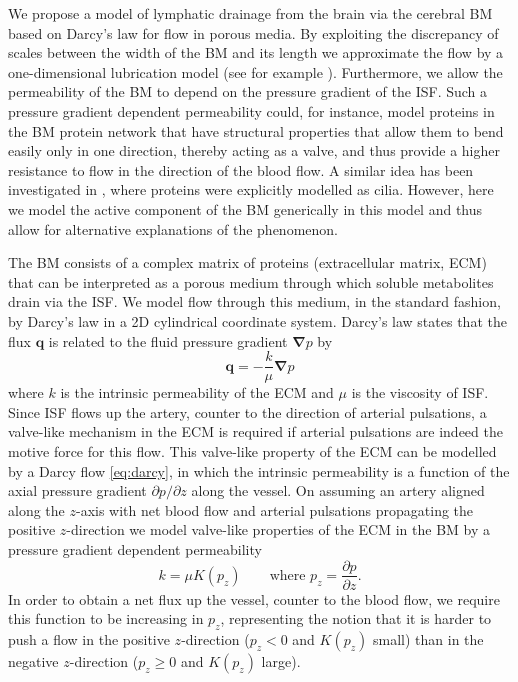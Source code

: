 \documentclass{frontiersFPHY} %
\newcommand{\q}{\boldsymbol{q}}
\newcommand{\dd}{\partial}
\begin{document}
We propose a model of lymphatic drainage from the brain via the cerebral BM based on Darcy's law for flow in porous media. By exploiting the discrepancy of scales between the width of the BM and its length we approximate the flow by a one-dimensional lubrication model (see for example \cite{Ockendon1995}). Furthermore, we allow the permeability of the BM to depend on the pressure gradient of the ISF. Such a pressure gradient dependent permeability could, for instance, model proteins in the BM protein network that have structural properties that allow them to bend easily only in one direction, thereby acting as a valve, and thus provide a higher resistance to flow in the direction of the blood flow. A similar idea has been investigated in \cite{Sharp2015}, where proteins were explicitly modelled as cilia. However, here we model the active component of the BM generically in this model and thus allow for alternative explanations of the phenomenon.

The BM consists of a complex matrix of proteins (extracellular matrix, ECM) that can be interpreted as a porous medium through which soluble metabolites drain via the ISF. We model flow through this medium, in the standard fashion, by Darcy's law in a 2D cylindrical coordinate system. Darcy's law states that the flux $\q$ is related to the fluid pressure gradient $\boldsymbol{\nabla} p$ by
\begin{equation}\label{eq:darcy}
  \q = -\frac{k}{\mu} \boldsymbol{\nabla} p
\end{equation}
where $k$ is the intrinsic permeability of the ECM and $\mu$ is the viscosity of ISF. Since ISF flows up the artery, counter to the direction of arterial pulsations, a valve-like mechanism in the ECM is required if arterial pulsations are indeed the motive force for this flow. This valve-like property of the ECM can be modelled by a Darcy flow \eqref{eq:darcy}, in which the intrinsic permeability is a function of the axial pressure gradient $\dd p / \dd z$ along the vessel. On assuming an artery aligned along the $z$-axis with net blood flow and arterial pulsations propagating the positive $z$-direction we model valve-like properties of the ECM in the BM by a pressure gradient dependent permeability
\begin{equation}
k = \mu K(p_z) \qquad \text{where } p_z = \frac{\dd p}{\dd z}.
\end{equation}
In order to obtain a net flux up the vessel, counter to the blood flow, we require this function to be increasing in $p_z$, representing the notion that it is harder to push a flow in the positive $z$-direction ($p_z < 0$ and $K(p_z)$ small) than in the negative $z$-direction ($p_z \geq 0$ and $K(p_z)$ large).
\end{document}
